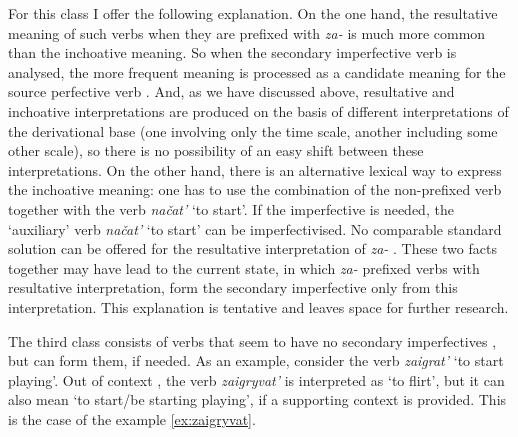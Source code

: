 For this class I offer the following explanation. On the one hand, the resultative  meaning of such verbs when they are prefixed with \textit{za-}   is much more common than the inchoative  meaning. So when the secondary imperfective  verb  is analysed, the more frequent meaning is processed as a candidate meaning for the source perfective verb . And, as we have discussed above, resultative  and inchoative  interpretations are produced on the basis of different interpretations of the derivational base (one involving only the time scale, another including some other scale), so there is no possibility of an easy shift between these interpretations. On the other hand, there is an alternative lexical way to express the inchoative  meaning: one has to use the combination of the non-prefixed verb together with the verb \textit{na\v{c}at'} `to start'. If the imperfective is needed, the `auxiliary' verb \textit{na\v{c}at'} `to start' can be imperfectivised. No comparable standard solution can be offered for the resultative  interpretation of \textit{za-}  . These two facts together may have lead to the current state, in which \textit{za-}  prefixed verbs with resultative  interpretation, form the secondary imperfective  only from this interpretation. This explanation is tentative and leaves space for further research.

The third class consists of verbs that seem to have no secondary imperfectives , but can form them, if needed. As an example, consider the verb \textit{zaigrat'} `to start playing'. Out of context  , the verb \textit{zaigryvat'} is interpreted as `to flirt', but it can also mean `to start/be starting playing', if a supporting context   is provided. This is the case of the example \ref{ex:zaigryvat}. 

